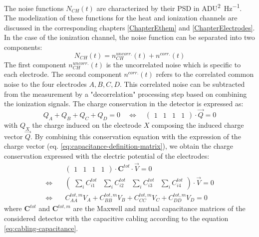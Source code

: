 The noise functions $N_{CH}(t)$ are characterized by their PSD in \si{\textsf{ADU}^2\per\Hz}. The modelization of these functions for the heat and ionization channels are discussed in the corresponding chapters \ref{ChapterEthem} and \ref{ChapterElectrodes}. In the case of the ionization channel, the noise function can be separated into two components:
\begin{equation}
\label{eq:noise-corr}
N_{CH}(t) = n_{CH}^{uncorr.}(t) + n^{corr.}(t)
\end{equation}
The first component $n_{CH}^{uncorr.}(t)$ is the uncorrelated noise which is specific to each electrode. The second component $n^{corr.}(t)$ refers to the correlated common noise to the four electrodes $A,B,C,D$. This correlated noise can be subtracted from the measurement by a "decorrelation" processing step based on combining the ionization signals.
The charge conservation in the detector is expressed as:
\begin{equation}
\label{eq:charge-conservation}
Q_A + Q_B + Q_C + Q_D = 0
\quad \Leftrightarrow \quad
\begin{pmatrix}
1 & 1 & 1 & 1
\end{pmatrix}
\cdot \vec{Q} = 0
\end{equation}
 with $Q_X$ the charge induced on the electrode $X$ composing the induced charge vector $\vec{Q}$. By combining this conservation equation with the expression of the charge vector (eq. \ref{eq:capacitance-definition-matrix}), we obtain the charge conservation expressed with the electric potential of the electrodes:
\begin{equation}
\begin{split}
& \begin{pmatrix}
1 & 1 & 1 & 1
\end{pmatrix} \cdot 
\bm{C}^{tot} \cdot \vec{V} = 0 \\
\Leftrightarrow \quad & 
\begin{pmatrix}
\sum_i C_{i1}^{tot} & \sum_i C_{i2}^{tot} & \sum_i C_{i3}^{tot} & \sum_i C_{i4}^{tot}
\end{pmatrix}
\cdot \vec{V} = 0 \\
\Leftrightarrow \quad &
C_{AA}^{tot, m} V_A + C_{BB}^{tot, m} V_B + C_{CC}^{tot, m} V_C + C_{DD}^{tot, m} V_D = 0
\end{split}
\end{equation}
where $\bm{C}^{tot}$ and $\bm{C}^{tot, m}$ are the Maxwell and mutual capacitance matrices of the considered detector with the capacitive cabling according to the equation \ref{eq:cabling-capacitance}.
